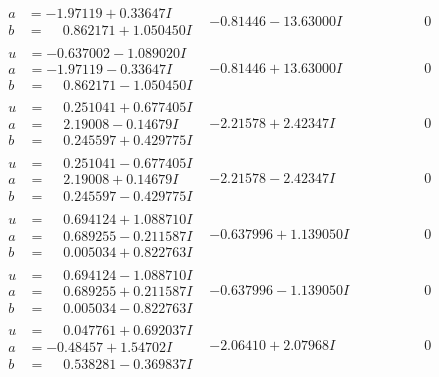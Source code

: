 \documentclass[1p]{elsarticle_modified}
\theoremstyle{definition}
\begin{document}
$$\begin{array}{c|c|c}
\begin{aligned}
a &= -1.97119 + 0.33647 I \\
b &= \phantom{-}0.862171 + 1.050450 I\end{aligned}
 & -0.81446 - 13.63000 I & \phantom{-0.000000 } 0 \\ \hline\begin{aligned}
u &= -0.637002 - 1.089020 I \\
a &= -1.97119 - 0.33647 I \\
b &= \phantom{-}0.862171 - 1.050450 I\end{aligned}
 & -0.81446 + 13.63000 I & \phantom{-0.000000 } 0 \\ \hline\begin{aligned}
u &= \phantom{-}0.251041 + 0.677405 I \\
a &= \phantom{-}2.19008 - 0.14679 I \\
b &= \phantom{-}0.245597 + 0.429775 I\end{aligned}
 & -2.21578 + 2.42347 I & \phantom{-0.000000 } 0 \\ \hline\begin{aligned}
u &= \phantom{-}0.251041 - 0.677405 I \\
a &= \phantom{-}2.19008 + 0.14679 I \\
b &= \phantom{-}0.245597 - 0.429775 I\end{aligned}
 & -2.21578 - 2.42347 I & \phantom{-0.000000 } 0 \\ \hline\begin{aligned}
u &= \phantom{-}0.694124 + 1.088710 I \\
a &= \phantom{-}0.689255 - 0.211587 I \\
b &= \phantom{-}0.005034 + 0.822763 I\end{aligned}
 & -0.637996 + 1.139050 I & \phantom{-0.000000 } 0 \\ \hline\begin{aligned}
u &= \phantom{-}0.694124 - 1.088710 I \\
a &= \phantom{-}0.689255 + 0.211587 I \\
b &= \phantom{-}0.005034 - 0.822763 I\end{aligned}
 & -0.637996 - 1.139050 I & \phantom{-0.000000 } 0 \\ \hline\begin{aligned}
u &= \phantom{-}0.047761 + 0.692037 I \\
a &= -0.48457 + 1.54702 I \\
b &= \phantom{-}0.538281 - 0.369837 I\end{aligned}
 & -2.06410 + 2.07968 I & \phantom{-0.000000 } 0 \\ \hline\begin{aligned}

\end{aligned}
\end{array}$$
\end{document}
